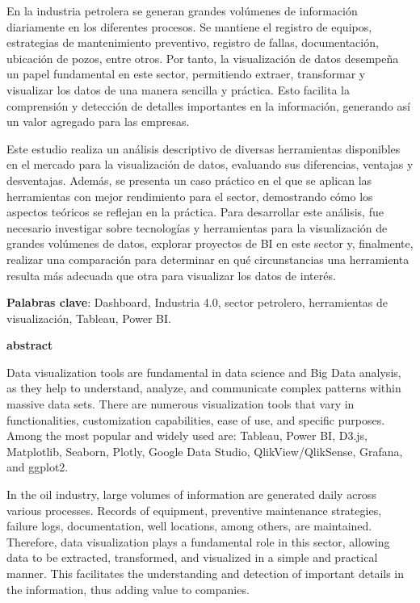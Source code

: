 \documentclass[
  11pt,
  bookmarksnumbered]{article}
\begin{document}
En la industria petrolera se generan grandes volúmenes de información diariamente en los diferentes procesos.
Se mantiene el registro de equipos, estrategias de mantenimiento preventivo, registro de fallas, documentación, ubicación de pozos, entre otros.
Por tanto, la visualización de datos desempeña un papel fundamental en este sector, permitiendo extraer, transformar y visualizar los datos de una manera sencilla y práctica.
Esto facilita la comprensión y detección de detalles importantes en la información, generando así un valor agregado para las empresas.

Este estudio realiza un análisis descriptivo de diversas herramientas disponibles en el mercado para la visualización de datos, evaluando sus diferencias, ventajas y desventajas.
Además, se presenta un caso práctico en el que se aplican las herramientas con mejor rendimiento para el sector, demostrando cómo los aspectos teóricos se reflejan en la práctica.
Para desarrollar este análisis, fue necesario investigar sobre tecnologías y herramientas para la visualización de grandes volúmenes de datos, explorar proyectos de BI en este sector y, finalmente, realizar una comparación para determinar en qué circunstancias una herramienta resulta más adecuada que otra para visualizar los datos de interés.

\textbf{Palabras clave}: Dashboard, Industria 4.0, sector petrolero, herramientas de visualización, Tableau, Power BI.

\newpage

\begin{center}
\textbf{abstract}
\end{center}

Data visualization tools are fundamental in data science and Big Data analysis, as they help to understand, analyze, and communicate complex patterns within massive data sets.
There are numerous visualization tools that vary in functionalities, customization capabilities, ease of use, and specific purposes.
Among the most popular and widely used are: Tableau, Power BI, D3.js, Matplotlib, Seaborn, Plotly, Google Data Studio, QlikView/QlikSense, Grafana, and ggplot2.

In the oil industry, large volumes of information are generated daily across various processes.
Records of equipment, preventive maintenance strategies, failure logs, documentation, well locations, among others, are maintained.
Therefore, data visualization plays a fundamental role in this sector, allowing data to be extracted, transformed, and visualized in a simple and practical manner.
This facilitates the understanding and detection of important details in the information, thus adding value to companies.
\end{document}
